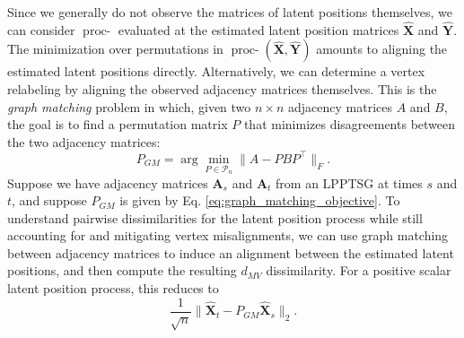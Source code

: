\documentclass[12pt]{article}
\theoremstyle{definition}
\newcommand{\bA}{\mathbf{A}}
\newcommand{\bX}{\mathbf{X}}
\newcommand{\bY}{\mathbf{Y}}
\newcommand{\Xhat}{\hat{\bX}}
\newcommand{\Yhat}{\hat{\bY}}
\newcommand{\procwphat}[1][2]{\mathop{\mbox{proc-$\hat{W}_#1$}}}
\begin{document}
 Since we generally do not observe the matrices of latent positions themselves, we can consider $\procwphat$ evaluated at the estimated latent position matrices $\Xhat$ and $\Yhat$. The minimization over permutations in $\procwphat(\Xhat, \Yhat)$ amounts to aligning the estimated latent positions directly. Alternatively, we can determine a vertex relabeling by aligning the observed adjacency matrices themselves. This is the {\em graph matching} problem \cite{conte04:_thirt, lyzinski15:_relax, sgm_jofc} in which, given two $n \times n$ adjacency matrices $A$ and $B$, the goal is to find a permutation matrix $P$ that minimizes disagreements between the two adjacency matrices:
\begin{equation}\label{eq:graph_matching_objective}
P_{GM}=\arg\min_{P\in \mathcal{P}_n} \|A-PBP^{\top}\|_F.
\end{equation}
Suppose we have adjacency matrices $\bA_s$ and $\bA_t$ from an LPPTSG at times $s$ and $t$, and suppose $P_{GM}$ is given by Eq. \eqref{eq:graph_matching_objective}. To understand pairwise dissimilarities for the latent position process while still accounting for and mitigating vertex misalignments, we can use graph matching between adjacency matrices to induce an alignment between the estimated latent positions, and then compute the resulting $d_{MV}$ dissimilarity. For a positive scalar latent position process, this reduces to  
$$
\frac{1}{\sqrt{n}} \| \hat{\bX}_t - P_{GM}\hat{\bX}_s\|_2 .
$$
\end{document}
